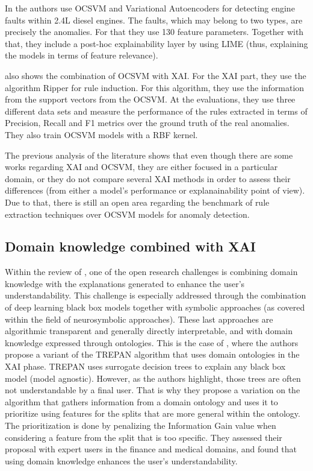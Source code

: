 In \parencite{jang2019anomaly} the authors use OCSVM and Variational Autoencoders for detecting engine faults within 2.4L diesel engines. The faults, which may belong to two types, are precisely the anomalies. For that they use 130 feature parameters. Together with that, they include a post-hoc explainability layer by using LIME (thus, explaining the models in terms of feature relevance).

\parencite{padmaja2015hybrid} also shows the combination of OCSVM with XAI. For the XAI part, they use the algorithm Ripper for rule induction. For this algorithm, they use the information from the support vectors from the OCSVM. At the evaluations, they use three different data sets and measure the performance of the rules extracted in terms of Precision, Recall and F1 metrics over the ground truth of the real anomalies. They also train OCSVM models with a RBF kernel.

The previous analysis of the literature shows that even though there are some works regarding XAI and OCSVM, they are either focused in a particular domain, or they do not compare several XAI methods in order to assess their differences (from either a model's performance or explanainability point of view). Due to that, there is still an open area regarding the benchmark of rule extraction techniques over OCSVM models for anomaly detection.

\subsection{Domain knowledge combined with XAI}\label{subsec:ch2-domain-knowledge-xai}
Within the review of \parencite{arrieta2020explainable}, one of the open research challenges is combining domain knowledge with the explanations generated to enhance the user's understandability. This challenge is especially addressed through the combination of deep learning black box models together with symbolic approaches (as covered within the field of neurosymbolic approaches). These last approaches are algorithmic transparent and generally directly interpretable, and with domain knowledge expressed through ontologies. This is the case of \parencite{confalonieritrepan}, where the authors propose a variant of the TREPAN algorithm that uses domain ontologies in the XAI phase. TREPAN uses surrogate decision trees to explain any black box model (model agnostic). However, as the authors highlight, those trees are often not understandable by a final user. That is why they propose a variation on the algorithm that gathers information from a domain ontology and uses it to prioritize using features for the splits that are more general within the ontology. The prioritization is done by penalizing the Information Gain value when considering a feature from the split that is too specific.  They assessed their proposal with expert users in the finance and medical domains, and found that using domain knowledge enhances the user's understandability.

